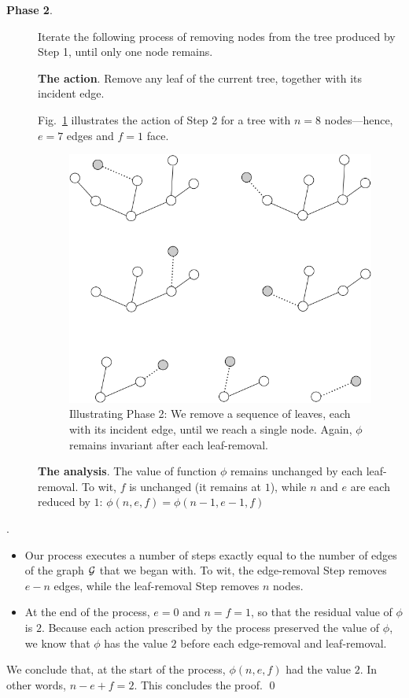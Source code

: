 \begin{description}
\item[{\bf Phase 2}.]
Iterate the following process of removing nodes from the tree produced
by Step 1, until only one node remains.
\bigskip

{\bf The action}.
Remove any leaf of the current tree, together with its incident edge.

Fig.~\ref{fig:planarStep2} illustrates the action of Step 2
for a tree  with $n=8$ nodes---hence, $e=7$ edges and $f=1$ face.
\begin{figure}[hbt]
\begin{center}
   \includegraphics[scale=0.4]{FiguresGraph/planarStep2}
   \caption{Illustrating Phase 2: We remove a sequence of leaves, each
     with its incident edge, until we reach a single node.  Again,
     $\phi$ remains invariant after each leaf-removal.}
  \label{fig:planarStep2}
\end{center}
\end{figure}

\bigskip

{\bf The analysis}.
The value of function $\phi$ remains unchanged by each leaf-removal.
To wit, $f$ is unchanged (it remains at $1$), while $n$ and $e$ are
each reduced by $1$: $\phi(n,e,f) = \phi(n-1,e-1,f)$
\end{description}

.
\begin{itemize}
\item
Our process executes a number of steps exactly equal to the number of
edges of the graph $\mbox{$\cal G$}$ that we began with.  To wit, the edge-removal
Step removes $e-n$ edges, while the leaf-removal Step removes $n$
nodes.
\item
At the end of the process, $e=0$ and $n=f=1$, so that the residual
value of $\phi$ is $2$.  Because each action prescribed by the process
preserved the value of $\phi$, we know that $\phi$ has the value $2$
before each edge-removal and leaf-removal.
\end{itemize}
We conclude that, at the
start of the process,  $\phi(n,e,f)$ had the value $2$.  In other
words, $n-e+f = 2$.  This concludes the proof.  \qed

